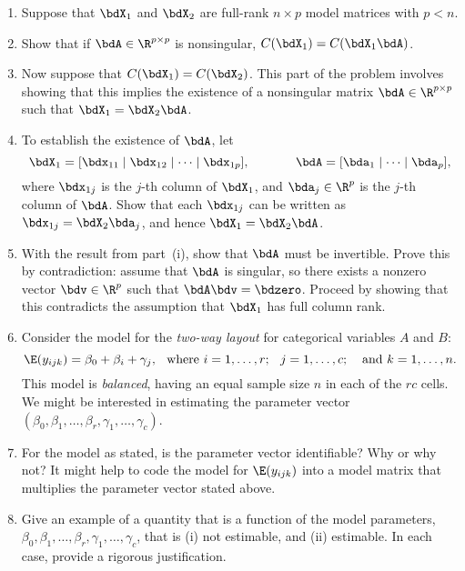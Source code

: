 \begin{enumerate}
\begin{hwanswer}
\end{hwanswer}
\item 
Suppose that $\bdX_1$ and $\bdX_2$ are full-rank 
$n\times p$ model matrices with $p<n$.
\be
\item Show that if 
$\bdA \in \R^{p\times p}$ 
is nonsingular, 
$C(\bdX_1) = C(\bdX_1\bdA)$.
\item Now suppose that $C(\bdX_1) = C(\bdX_2)$.
This part of the problem involves
showing that this implies the existence of a nonsingular matrix
$\bdA \in \R^{p\times p}$ 
such that $\bdX_1 = \bdX_2 \bdA$.
\be
\item To establish the existence of $\bdA$, let 
\[
\bdX_1 = [\bdx_{11} \mid \bdx_{12} \mid \cdots \mid \bdx_{1p}],
\hspace{0.5in}
\bdA = [\bda_1 \mid \cdots \mid \bda_p],
\]
where $\bdx_{1j}$ is the $j$-th column of $\bdX_1$,
and $\bda_j \in \R^p$ is the $j$-th column of $\bdA$.
Show that each
$\bdx_{1j}$ can be written as 
$\bdx_{1j} = \bdX_2 \bda_j$, and hence $\bdX_1 = \bdX_2\bdA$.
\item With the result from part~(i), 
show that $\bdA$ must be invertible.
Prove this by contradiction:
assume that $\bdA$ is
singular, so there exists a nonzero vector $\bdv \in \R^p$ 
such that $\bdA\bdv = \bdzero$.
Proceed by showing that this contradicts the assumption that $\bdX_1$
has full column rank.
\ee
\ee

\item 
Consider the model for the \textit{two-way layout} for 
categorical variables
$A$ and $B$:
\[
\E(y_{ijk}) = \beta_0 + \beta_i + \gamma_j, \hspace{0.1 in}
\text{where } i = 1, \dots, r; \hspace{0.1 in} j = 1, \dots,
c;\hspace{0.1 in} \text{ and } k = 1, \dots, n.
\]
This model is \textit{balanced}, having an equal sample size $n$ in each 
of the $rc$ cells. 
We might be interested in estimating the parameter vector
$(\beta_0, \beta_1,\ldots, \beta_r, \gamma_1,\ldots,\gamma_c)$.
\be
\item For the model as stated, is the parameter vector identifiable? 
Why or why not?
It might help to code the model for $\E(y_{ijk})$ into a model matrix 
that multiplies the parameter vector stated above.
\item Give an example of a quantity that is a function of
the model parameters,
$\beta_0, \beta_1,\ldots, \beta_r, \gamma_1,\ldots,\gamma_c$,
that is (i) not estimable, and (ii) estimable. 
In each case, provide a rigorous justification.
\ee


\end{enumerate}
